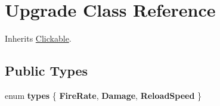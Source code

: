 \hypertarget{class_upgrade}{\section{Upgrade Class Reference}
\label{class_upgrade}
}


Inherits \hyperlink{class_clickable}{Clickable}.

\subsection*{Public Types}
\begin{DoxyCompactItemize}
\item 
\hypertarget{class_upgrade_a5834f56fecec704c0c9a25158bd09b0b}{enum {\bfseries types} \{ {\bfseries Fire\+Rate}, 
{\bfseries Damage}, 
{\bfseries Reload\+Speed}
 \}}\label{class_upgrade_a5834f56fecec704c0c9a25158bd09b0b}

\end{DoxyCompactItemize}
